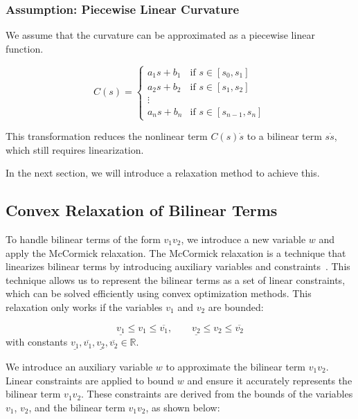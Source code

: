 \subsubsection{Assumption: Piecewise Linear Curvature}

We assume that the curvature can be approximated as a piecewise linear function.

\[
	C(s) = \begin{cases}
		a_1s+b_1 & \text{if } s \in [s_0, s_1]     \\
		a_2s+b_2 & \text{if } s \in [s_1, s_2]     \\
		\vdots                                     \\
		a_ns+b_n & \text{if } s \in [s_{n-1}, s_n]
	\end{cases}
\]

This transformation reduces the nonlinear term $C(s)\dot{s}$ to a bilinear term $s\dot{s}$, which still requires linearization.

In the next section, we will introduce a relaxation method to achieve this.

\subsection{Convex Relaxation of Bilinear Terms} \label{subsec:convex_relaxation_for_bilinear_terms}

To handle bilinear terms of the form $v_1v_2$, we introduce a new variable $w$ and apply the McCormick relaxation.
The McCormick relaxation is a technique that linearizes bilinear terms by introducing auxiliary variables and
constraints~\cite{mccormick_computability_1976}.
This technique allows us to represent the bilinear terms as a set of linear constraints, which can be solved efficiently using convex optimization
methods.
This relaxation only works if the variables $v_1$ and $v_2$ are bounded:

\[ \underline{v_1} \leq v_1 \leq \overline{v_1}, \qquad
	\underline{v_2} \leq v_2 \leq \overline{v_2} \] with constants $\underline{v_1}, \overline{v_1}, \underline{v_2}, \overline{v_2} \in \mathbb{R}$.

We introduce an auxiliary variable $w$ to approximate the bilinear term $v_1v_2$.
Linear constraints are applied to bound $w$ and ensure it accurately represents the bilinear term $v_1v_2$.
These constraints are derived from the bounds of the variables $v_1$, $v_2$, and the bilinear term $v_1v_2$, as shown below:

